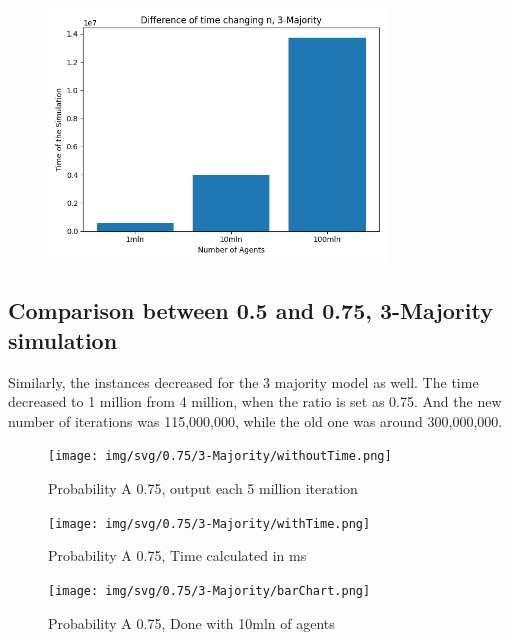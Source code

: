 \begin{figure}[H]
     \centering
     \includegraphics[width=0.80\textwidth,height=0.37\textheight]{img/svg/3_Majority/TimeDifferenceN.png}
\end{figure}
\newpage

\subsection[0.5-0.75 3Majority]{Comparison between 0.5 and 0.75, 3-Majority simulation}
Similarly, the instances decreased for the 3 majority model as well. The time decreased to 1 million from 4 million, when the ratio is set as 0.75. And the new number of iterations was 115,000,000, while the old one was around 300,000,000.
\begin{figure}[H]
     \centering
     \texttt{[image: img/svg/0.75/3-Majority/withoutTime.png]}
     \caption{Probability A 0.75, output each 5 million iteration}
\end{figure}
\begin{figure}[H]
     \centering
     \texttt{[image: img/svg/0.75/3-Majority/withTime.png]}
     \caption{Probability A 0.75, Time calculated in ms}
\end{figure}
\begin{figure}[H]
     \centering
     \texttt{[image: img/svg/0.75/3-Majority/barChart.png]}
     \caption{Probability A 0.75, Done with 10mln of agents}
\end{figure}